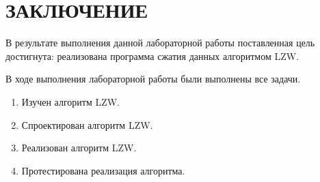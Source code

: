 \newpage

\chapter*{ЗАКЛЮЧЕНИЕ}

В результате выполнения данной лабораторной работы поставленная цель достигнута: реализована программа сжатия данных алгоритмом LZW.

В ходе выполнения лабораторной работы были выполнены все задачи.

\begin{enumerate}[label=\arabic*)]
	\item Изучен алгоритм LZW.
	\item Спроектирован алгоритм LZW.
	\item Реализован алгоритм LZW.
	\item Протестирована реализация алгоритма.
\end{enumerate}